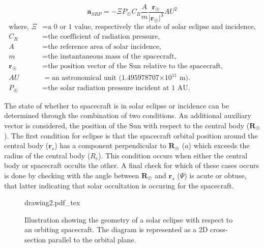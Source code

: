 \begin{equation}
    \mathbf{a}_{SRP}=-\Xi{}P_\Sun{C}_R\frac{A}{m}\frac{\mathbf{r}_{\Sun}}{|\mathbf{r}_\Sun|^3}AU^2
\end{equation}
\begin{equation*}
    \begin{aligned}
        \textrm{where, }
        \Xi &= \textrm{a 0 or 1 value, respectively the state of solar eclipse and incidence,}\\
        C_R &= \textrm{the coefficient of radiation pressure,} \\
        A  &= \textrm{the reference area of solar incidence,} \\
        m & = \textrm{the instantaneous mass of the spacecraft,} \\
        \mathbf{r}_\Sun &= \textrm{the position vector of the Sun relative to the spacecraft,} \\
        AU &= \textrm{an astronomical unit (1.495978707×${10^{11}}$ m).} \\
        P_\Sun &=  \textrm{the solar radiation pressure incident at 1 AU.}
    \end{aligned}
\end{equation*}

The state of whether to spacecraft is in solar eclipse or incidence can be
determined through the combination of two conditions. An additional auxiliary
vector is considered, the position of the Sun with respect to the central body
($\mathbf{R}_\Sun$). The first condition for eclipse is that the spacecraft
orbital position around the central body ($\mathbf{r}_s$) has a component
perpendicular to $\mathbf{R}_\Sun$ ($a$) which exceeds the radius of the central
body ($R_e$). This condition occurs when either the central body or spacecraft
occults the other. A final check for which of these cases occurs is done by
checking with the angle between $\mathbf{R}_\Sun$ and $\mathbf{r}_s$ ($\Psi$) is
acute or obtuse, that latter indicating that solar occultation is occuring for
the spacecraft.

\begin{figure}[h]
    \centering
    \def\svgwidth{0.8\linewidth}
    {drawing2.pdf_tex}
    \caption{
        Illustration showing the geometry of a solar eclipse with respect to an
        orbiting spacecraft. \textmd{The diagram is represented as a 2D
        cross-section parallel to the orbital plane.}
    }
    \label{fig:my_label}
\end{figure}


